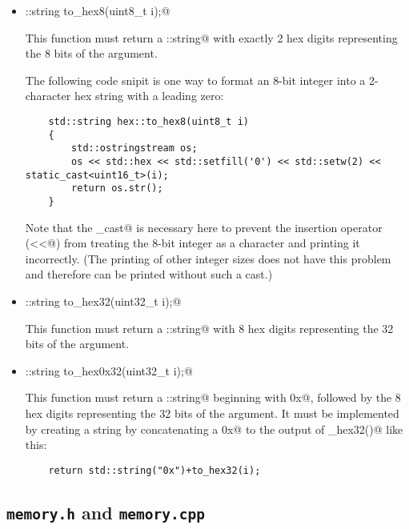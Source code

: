 \documentclass[11pt]{article}
\begin{document}
\begin{itemize}
\item \verb@std::string to_hex8(uint8_t i);@

This function must return a \verb@std::string@ with exactly 2 hex digits 
representing the 8 bits of the \verb@i@ argument.

The following code snipit is one way to format an 8-bit integer into a 
2-character hex string with a leading zero:

\begin{minipage}{\textwidth}
{\footnotesize
\begin{verbatim}
    std::string hex::to_hex8(uint8_t i)
    {
        std::ostringstream os;
        os << std::hex << std::setfill('0') << std::setw(2) << static_cast<uint16_t>(i);
        return os.str();
    }
\end{verbatim}
}
\end{minipage}

Note that the \verb@static_cast@ is necessary here to prevent the insertion 
operator (\verb@<<@) from treating the 8-bit integer as a character and printing
it incorrectly.  (The printing of other integer sizes does not have this problem 
and therefore can be printed without such a cast.)

\item \verb@std::string to_hex32(uint32_t i);@

This function must return a \verb@std::string@ with 8 hex digits representing the
32 bits of the \verb@i@ argument.

\item \verb@std::string to_hex0x32(uint32_t i);@

This function must return a \verb@std::string@ beginning with \verb@0x@, followed by
the 8 hex digits representing the 32 bits of the \verb@i@ argument.  It must be
implemented by creating a string by concatenating a \verb@0x@ to the output of
\verb@to_hex32()@ like this:
\begin{verbatim}
    return std::string("0x")+to_hex32(i);
\end{verbatim}

\end{itemize}



\subsection{{\tt memory.h} and {\tt memory.cpp}}
\end{document}
